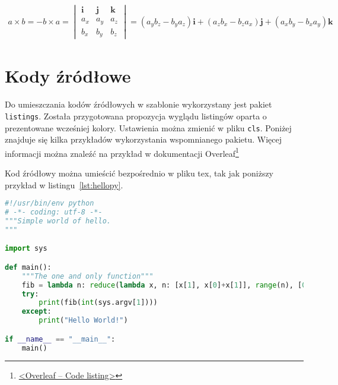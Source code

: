 \begin{gather}
	a \times b = -b \times a =
	\begin{vmatrix}
		\pmb{i} & \pmb{j} & \pmb{k} \\
		a_x     & a_y     & a_z     \\
		b_x     & b_y     & b_z
	\end{vmatrix}
	= \left(a_y b_z - b_y a_z \right)\pmb{i}
	+ \left(a_z b_x - b_z a_x \right)\pmb{j}
	+ \left(a_x b_y - b_x a_y \right)\pmb{k}
\end{gather}


\section{Kody źródłowe}
Do umieszczania kodów źródłowych w szablonie wykorzystany jest pakiet \texttt{listings}. Została przygotowana propozycja wyglądu listingów oparta o prezentowane wcześniej kolory. Ustawienia można zmienić w pliku \texttt{cls}. Poniżej znajduje się kilka przykładów wykorzystania wspomnianego pakietu. Więcej informacji można znaleźć na przykład w dokumentacji Overleaf\footnote{\href{https://www.overleaf.com/learn/latex/code_listing}{<Overleaf -- Code listing>}}

Kod źródłowy można umieścić bezpośrednio w pliku tex, tak jak poniższy przykład w listingu~\ref{lst:hellopy}.

\begin{lstlisting}[language=Python,
    caption={Prosty program w języku Python},
    label={lst:hellopy}]
#!/usr/bin/env python
# -*- coding: utf-8 -*-
"""Simple world of hello.
"""

import sys

def main():
    """The one and only function"""
    fib = lambda n: reduce(lambda x, n: [x[1], x[0]+x[1]], range(n), [0, 1])[0]
    try:
        print(fib(int(sys.argv[1])))
    except:
        print("Hello World!")

if __name__ == "__main__":
    main()
\end{lstlisting}


